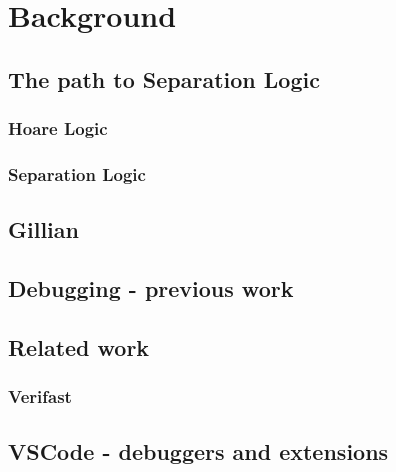 \chapter{Background}
\label{cha:background}


\section{The path to Separation Logic}

\subsection{Hoare Logic}

\subsection{Separation Logic}


\section{Gillian}

\section{Debugging - previous work}


\section{Related work}
\label{sec:related-work}

\subsection{Verifast}


\section{VSCode - debuggers and extensions}
